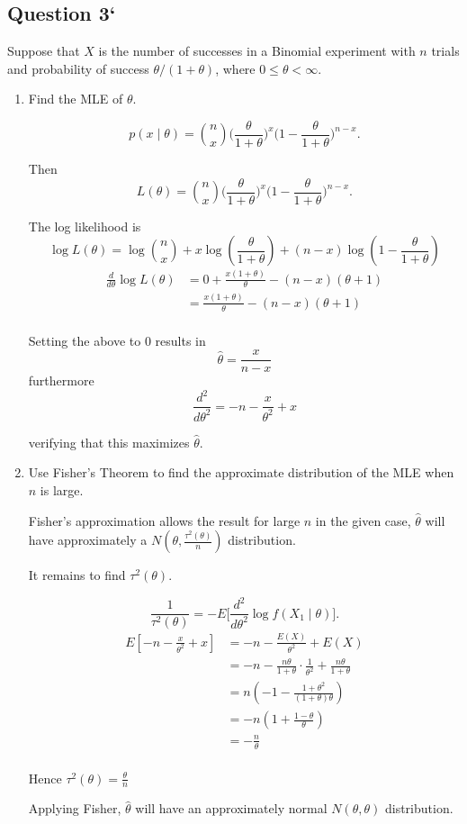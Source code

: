 \documentclass{tufte-book}
\theoremstyle{mytheoremstyle}
\theoremstyle{mylemstyle}
\theoremstyle{mydefstyle}
\begin{document}
\subsection{Question 3`}
Suppose that $X$ is the number of successes in a Binomial experiment with $n$ trials and probability of success $\theta/(1+\theta)$, where $0\leq \theta < \infty$.

\begin{enumerate}
\item Find the MLE of $\theta$.

\[p(x\mid \theta) = \binom{n}{x}\Big(\frac{\theta}{1+\theta}\Big)^x\big(1-\frac{\theta}{1+\theta} \Big)^{n-x}. \]

Then
\[L(\theta) = \binom{n}{x}\Big(\frac{\theta}{1+\theta}\Big)^x\big(1-\frac{\theta}{1+\theta} \Big)^{n-x}. \]

The log likelihood is
\[ \log L(\theta) = \log\binom{n}{x} + x \log(\frac{\theta}{1+\theta}) + (n-x)\log(1-\frac{\theta}{1+\theta}) \]
\begin{align*}
\frac{d}{d\theta} \log L(\theta) &= 0 + \frac{x(1+\theta)}{\theta} - (n-x)(\theta+1)\\
&= \frac{x(1+\theta)}{\theta} - (n-x)(\theta+1)\\
\end{align*}

Setting the above to $0$ results in
\[ \hat{\theta} = \frac{x}{n-x} \]
furthermore
\[\frac{d^2}{d\theta^2} = -n - \frac{x}{\theta^2} + x \]

verifying that this maximizes $\hat{\theta}$.

\item Use Fisher's Theorem to find the approximate distribution of the MLE when $n$ is large.

Fisher's approximation allows the result for large $n$ in the given case, $\hat{\theta}$ will have approximately a $N(\theta, \frac{\tau^2(\theta)}{n})$ distribution.

It remains to find $\tau^2(\theta)$.

\[ \frac{1}{\tau^2(\theta)} = -E\Big[ \frac{d^2}{d\theta^2} \log f(X_1\mid \theta)\Big]. \]
\begin{align*}
E[-n - \frac{x}{\theta^2} + x] &= -n - \frac{E(X)}{\theta^2} + E(X)\\
&= -n -\frac{n\theta}{1+\theta}\cdot \frac{1}{\theta^2} + \frac{n\theta}{1+\theta}\\
&= n(-1 - \frac{1+\theta^2}{(1+\theta)\theta})\\
&= -n(1 + \frac{1-\theta}{\theta})\\
&= -\frac{n}{\theta}\\
\end{align*}

Hence $\tau^2(\theta) = \frac{\theta}{n}$

Applying Fisher, $\hat{\theta}$ will have an approximately normal $N(\theta, \theta)$ distribution.

\end{enumerate}
\end{document}
